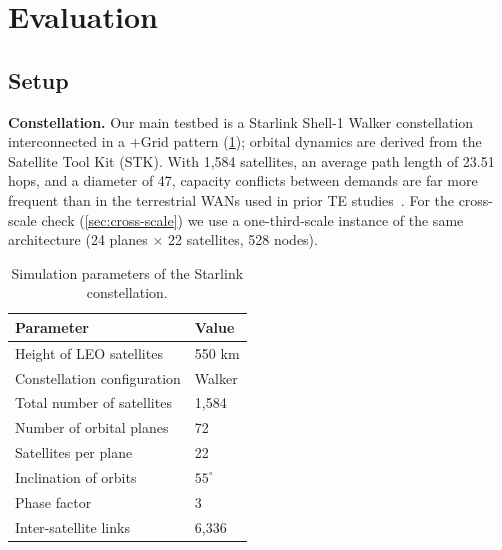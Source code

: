 \section{Evaluation}
\label{sec:eval}


\subsection{Setup}
\label{sec:setup}

\textbf{Constellation.} Our main testbed is a Starlink Shell-1 Walker
constellation~\cite{giuliari2020} interconnected in a $+$Grid pattern
(\cref{tab:constellation}); orbital dynamics are derived from the
Satellite Tool Kit (STK). With 1{,}584 satellites, an average path length
of 23.51 hops, and a diameter of 47, capacity conflicts between demands
are far more frequent than in the terrestrial WANs used in prior TE
studies~\cite{teal}. For the cross-scale check
(\cref{sec:cross-scale}) we use a one-third-scale instance of the same
architecture (24 planes $\times$ 22 satellites, 528 nodes).

\begin{table}[t]
    \caption{Simulation parameters of the Starlink constellation.}
    \label{tab:constellation}
    \centering
    \footnotesize
    \begin{tabular}{@{}ll@{}}
        \toprule
        Parameter & Value \\
        \midrule
        Height of LEO satellites & 550 km \\
        Constellation configuration & Walker \\
        Total number of satellites & 1{,}584 \\
        Number of orbital planes & 72 \\
        Satellites per plane & 22 \\
        Inclination of orbits & $55^{\circ}$ \\
        Phase factor & 3 \\
        Inter-satellite links & 6{,}336 \\
        \bottomrule
    \end{tabular}
\end{table}


